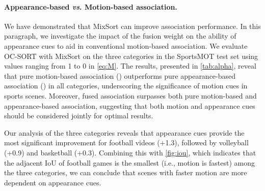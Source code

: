 \documentclass[10pt,twocolumn,letterpaper]{article}
\begin{document}
{\vspace{-4mm}
\paragraph{Appearance-based \textit{vs}. Motion-based association.}
\begin{table}[pt]
\centering
{}
\vspace{-2mm}
\caption {Comparison of the HOTA metric of basketball, volley and football under different fusion parameters  on SportsMOT test set. The models are trained on SportsMOT training set.}
\label{tab:alpha}
\vspace{-6mm}
\end{table}
We have demonstrated that MixSort can improve association performance. 
In this paragraph, we investigate the impact of the fusion weight  on the ability of appearance cues to aid in conventional motion-based association. We evaluate OC-SORT with MixSort on the three categories in the SportsMOT test set using  values ranging from 1 to 0 in \cref{eq:M}. The results, presented in \cref{tab:alpha}, reveal that pure motion-based association () outperforms pure appearance-based association () in all categories, underscoring the significance of motion cues in sports scenes. Moreover, fused association surpasses both pure motion-based and appearance-based association, suggesting that both motion and appearance cues should be considered jointly for optimal results.

Our analysis of the three categories reveals that appearance cues provide the most significant improvement for football videos (+1.3), followed by volleyball (+0.9) and basketball (+0.3). Combining this with \cref{fig:iou}, which indicates that the adjacent IoU of football games is the smallest (i.e., motion is fastest) among the three categories, we can conclude that scenes with faster motion are more dependent on appearance cues.

}
\end{document}
